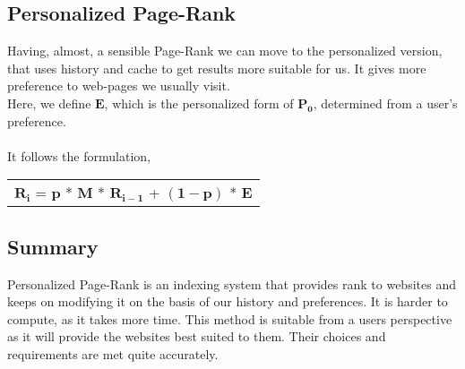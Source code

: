 \documentclass{article}
\begin{document}
\subsection*{Personalized Page-Rank}
Having, almost, a sensible Page-Rank we can move to the personalized version, that uses history and cache to get results more suitable for us. It gives more preference to web-pages we usually visit. \\
Here, we define $\mathbf{E}$, which is the personalized form of $\mathbf{P_0}$, determined from a user's preference. \\ \\ It follows the formulation,
\begin{center}
    \begin{tabular}{c}
        $\mathbf{R_i}$ = $\mathbf{p}$ * $\mathbf{M}$ * $\mathbf{R_{i-1}}$ + $\mathbf{(1-p)}$ * $\mathbf{E}$\\
    \end{tabular}
\end{center}
\pagebreak
\subsection*{Summary}
Personalized Page-Rank is an indexing system that provides rank to websites and keeps on modifying it on the basis of our history and preferences. It is harder to compute, as it takes more time. This method is suitable from a users perspective as it will provide the websites best suited to them. Their choices and requirements are met quite accurately.
\end{document}
